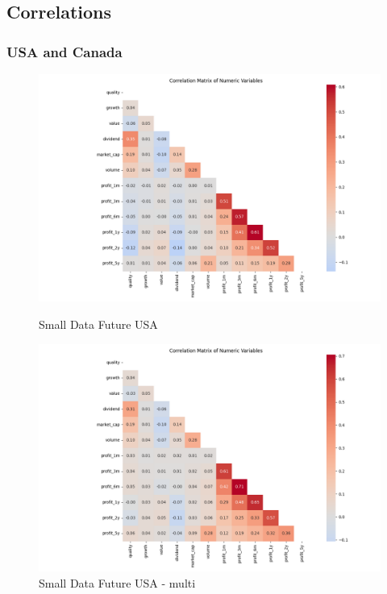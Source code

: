 \documentclass[11pt,english,a4paper,hidelinks]{book}
\begin{document}
\subsection{Correlations}

\subsubsection{USA and Canada}
\begin{figure}[H]
    \centering
    \begin{minipage}{0.48\textwidth}
        \centering
        \includegraphics[width=\linewidth]{images/code/descriptive analysis/correlations/Small Data future USA.png}
        \caption{Small Data Future USA}
        \label{fig:small_data_future_usa_correlations}
    \end{minipage}
    \begin{minipage}{0.48\textwidth}
        \centering
        \includegraphics[width=\linewidth]{images/code/descriptive analysis/correlations/Small Data future USA - Multi.png}
        \caption{Small Data Future USA - \acrshort{multi}}
        \label{fig:small_data_future_usa_multi_correlations}
    \end{minipage}
\end{figure}
\end{document}
